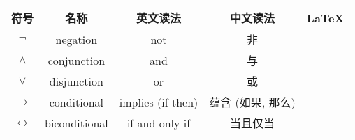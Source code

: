 
\begin{table}
  \centering
  \begin{tabular}{|c||c|c|c|c|}
    \hline
    符号& 名称 & 英文读法 & 中文读法 & \LaTeX \\
    \hline \hline
    $\lnot$ & negation & not & 非 & \\
    \hline
    $\land$ & conjunction & and & 与 &   \\
    \hline
    $\lor$ & disjunction & or & 或  & \\
    \hline
    $\to$ & conditional & implies (if then) & 蕴含 (如果, 那么) &   \\
    \hline
    $\leftrightarrow$ & biconditional & if and only if & 当且仅当 &   \\
    \hline
    \end{tabular}
\end{table}